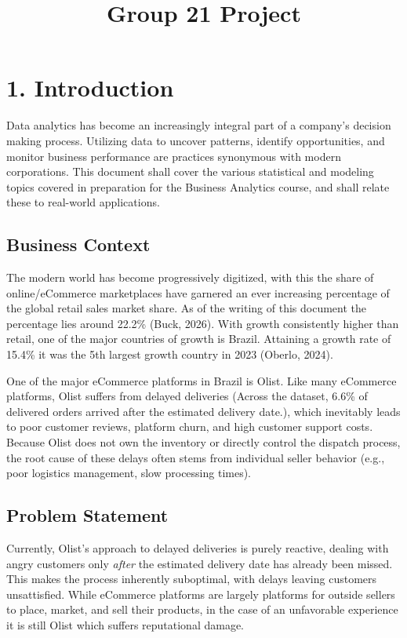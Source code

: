 \documentclass[
]{article}
\title{Group 21 Project}
\author{}
\date{\vspace{-2.5em}}
\begin{document}
\maketitle

\section{1. Introduction}\label{introduction}

Data analytics has become an increasingly integral part of a company's
decision making process. Utilizing data to uncover patterns, identify
opportunities, and monitor business performance are practices synonymous
with modern corporations. This document shall cover the various
statistical and modeling topics covered in preparation for the Business
Analytics course, and shall relate these to real-world applications.

\subsection{Business Context}\label{business-context}

The modern world has become progressively digitized, with this the share
of online/eCommerce marketplaces have garnered an ever increasing
percentage of the global retail sales market share. As of the writing of
this document the percentage lies around 22.2\% (Buck, 2026). With
growth consistently higher than retail, one of the major countries of
growth is Brazil. Attaining a growth rate of 15.4\% it was the 5th
largest growth country in 2023 (Oberlo, 2024).

One of the major eCommerce platforms in Brazil is Olist. Like many
eCommerce platforms, Olist suffers from delayed deliveries (Across the
dataset, 6.6\% of delivered orders arrived after the estimated delivery
date.), which inevitably leads to poor customer reviews, platform churn,
and high customer support costs. Because Olist does not own the
inventory or directly control the dispatch process, the root cause of
these delays often stems from individual seller behavior (e.g., poor
logistics management, slow processing times).

\subsection{Problem Statement}\label{problem-statement}

Currently, Olist's approach to delayed deliveries is purely reactive,
dealing with angry customers only \emph{after} the estimated delivery
date has already been missed. This makes the process inherently
suboptimal, with delays leaving customers unsattisfied. While eCommerce
platforms are largely platforms for outside sellers to place, market,
and sell their products, in the case of an unfavorable experience it is
still Olist which suffers reputational damage.
\end{document}

